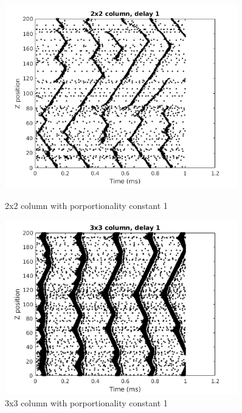\documentclass[a4paper,11pt]{article}
\begin{document}
\begin{figure}
  \centering
  \begin{minipage}{0.45\textwidth}
      \centering
      \includegraphics[width=0.9\textwidth]{fig/2x2_delay1}
      \caption{2x2 column with porportionality constant 1}
  \end{minipage}\hfill
  \begin{minipage}{0.45\textwidth}
      \centering
      \includegraphics[width=0.9\textwidth]{fig/3x3_delay1}
      \caption{3x3 column with porportionality constant 1}
  \end{minipage}
\end{figure}
\end{document}
